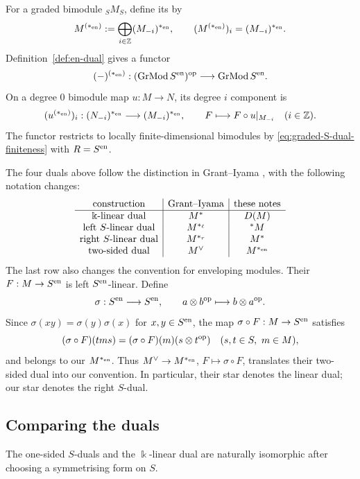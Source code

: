 \begin{advanced}[suppressfirstparskip=true,innertopmargin=0pt]
\label{not:graded-en-dual}
For a graded bimodule ${}_SM_S$, define its  by
\[
M^{\grstar[_{\en}]}:=\bigoplus_{i\in\Z}(M_{-i})^{*_{\en}},
\qquad (M^{\grstar[_{\en}]})_i=(M_{-i})^{*_{\en}}.
\]
Definition~\ref{def:en-dual} gives a functor
\begin{equation}\label{eq:graded-bimodule-dual-functors}
(-)^{\grstar[_{\en}]}:(\Grmod S^\en)^\op\longrightarrow\Grmod S^\en.
\end{equation}
On a degree $0$ bimodule map $u:M\to N$, its degree $i$ component is
\[
(u^{\grstar[_{\en}]})_i:(N_{-i})^{*_{\en}}\longrightarrow(M_{-i})^{*_{\en}},
\qquad F\longmapsto F\circ u|_{M_{-i}}
\quad(i\in\Z).
\]
The functor restricts to locally finite-dimensional bimodules by \eqref{eq:graded-S-dual-finiteness} with $R=S^\en$.

The four duals above follow the distinction in Grant--Iyama \cite[\S2.1, pp.~2592--2593]{GI20}, with the following notation changes:
\[
\begin{array}{c|c|c}
\text{construction}&\text{Grant--Iyama}&\text{these notes}\\ \hline
\Bbbk\text{-linear dual}&M^*&D(M)\\
\text{left }S\text{-linear dual}&M^{*_\ell}&{}^*M\\
\text{right }S\text{-linear dual}&M^{*_r}&M^*\\
\text{two-sided dual}&M^\vee&M^{*_{\en}}
\end{array}
\]
The last row also changes the convention for enveloping modules.
Their $F:M\to S^\en$ is left $S^\en$-linear.
Define
\[
\sigma:S^\en\longrightarrow S^\en,\qquad
a\otimes b^\op\longmapsto b\otimes a^\op.
\]
Since $\sigma(xy)=\sigma(y)\sigma(x)$ for $x,y\in S^\en$, the map $\sigma\circ F:M\to S^\en$ satisfies
\[
(\sigma\circ F)(tms)=(\sigma\circ F)(m)(s\otimes t^\op)
\quad(s,t\in S,\ m\in M),
\]
and belongs to our $M^{*_{\en}}$.
Thus $M^\vee\to M^{*_{\en}}$, $F\mapsto\sigma\circ F$, translates their two-sided dual into our convention.
In particular, their star denotes the linear dual; our star denotes the right $S$-dual.

\subsection{Comparing the duals}

The one-sided $S$-duals and the $\Bbbk$-linear dual are naturally isomorphic after choosing a symmetrising form on $S$.




\end{advanced}

